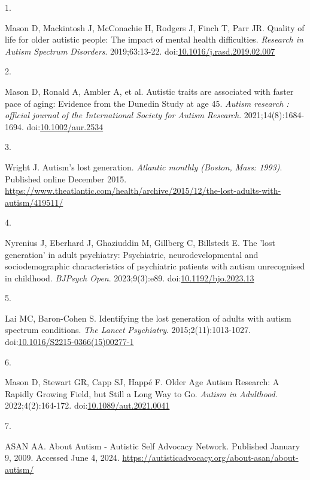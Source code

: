 \documentclass[
  letterpaper,
  DIV=11,
  numbers=noendperiod]{scrreprt}
\newlength{\cslhangindent}
\newlength{\csllabelwidth}
\newenvironment{CSLReferences}[2] %
 {\begin{list}{}{%
  \setlength{\itemindent}{0pt}
  \setlength{\leftmargin}{0pt}
  \setlength{\parsep}{0pt}
  \ifodd #1
   \setlength{\leftmargin}{\cslhangindent}
   \setlength{\itemindent}{-1\cslhangindent}
  \fi
  \setlength{\itemsep}{#2\baselineskip}}}
 {\end{list}}
\newcommand{\CSLLeftMargin}[1]{\parbox[t]{\csllabelwidth}{\strut#1\strut}}
\newcommand{\CSLRightInline}[1]{\parbox[t]{\linewidth - \csllabelwidth}{\strut#1\strut}}
\begin{document}
\label{refs}
\begin{CSLReferences}{0}{1}
\CSLLeftMargin{1. }%
\CSLRightInline{Mason D, Mackintosh J, McConachie H, Rodgers J, Finch T,
Parr JR. Quality of life for older autistic people: {The} impact of
mental health difficulties. \emph{Research in Autism Spectrum
Disorders}. 2019;63:13-22.
doi:\href{https://doi.org/10.1016/j.rasd.2019.02.007}{10.1016/j.rasd.2019.02.007}}

\CSLLeftMargin{2. }%
\CSLRightInline{Mason D, Ronald A, Ambler A, et al. Autistic traits are
associated with faster pace of aging: {Evidence} from the {Dunedin
Study} at age 45. \emph{Autism research : official journal of the
International Society for Autism Research}. 2021;14(8):1684-1694.
doi:\href{https://doi.org/10.1002/aur.2534}{10.1002/aur.2534}}

\CSLLeftMargin{3. }%
\CSLRightInline{Wright J. Autism's lost generation. \emph{Atlantic
monthly (Boston, Mass: 1993)}. Published online December 2015.
\url{https://www.theatlantic.com/health/archive/2015/12/the-lost-adults-with-autism/419511/}}

\CSLLeftMargin{4. }%
\CSLRightInline{Nyrenius J, Eberhard J, Ghaziuddin M, Gillberg C,
Billstedt E. The 'lost generation' in adult psychiatry: Psychiatric,
neurodevelopmental and sociodemographic characteristics of psychiatric
patients with autism unrecognised in childhood. \emph{BJPsych Open}.
2023;9(3):e89.
doi:\href{https://doi.org/10.1192/bjo.2023.13}{10.1192/bjo.2023.13}}

\CSLLeftMargin{5. }%
\CSLRightInline{Lai MC, Baron-Cohen S. Identifying the lost generation
of adults with autism spectrum conditions. \emph{The Lancet Psychiatry}.
2015;2(11):1013-1027.
doi:\href{https://doi.org/10.1016/S2215-0366(15)00277-1}{10.1016/S2215-0366(15)00277-1}}

\CSLLeftMargin{6. }%
\CSLRightInline{Mason D, Stewart GR, Capp SJ, Happé F. Older {Age Autism
Research}: {A Rapidly Growing Field}, but {Still} a {Long Way} to {Go}.
\emph{Autism in Adulthood}. 2022;4(2):164-172.
doi:\href{https://doi.org/10.1089/aut.2021.0041}{10.1089/aut.2021.0041}}

\CSLLeftMargin{7. }%
\CSLRightInline{ASAN AA. About {Autism} - {Autistic Self Advocacy
Network}. Published January 9, 2009. Accessed June 4, 2024.
\url{https://autisticadvocacy.org/about-asan/about-autism/}}


\end{CSLReferences}
\end{document}
